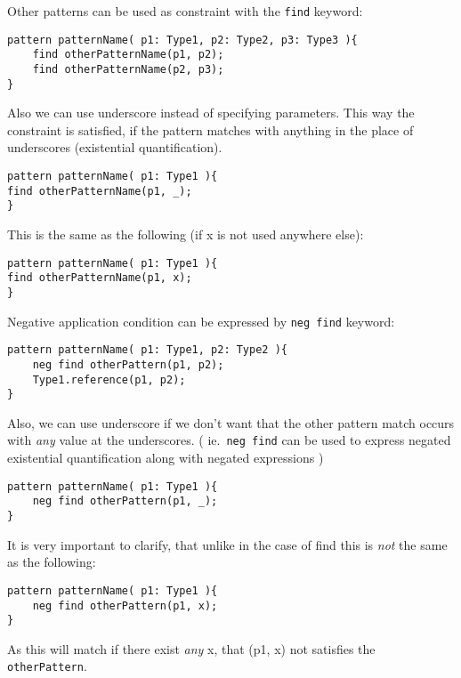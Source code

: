 \begin{minipage}{\textwidth}
Other patterns can be used as constraint with the \texttt{find} keyword:
\begin{lstlisting}[language=vql]
pattern patternName( p1: Type1, p2: Type2, p3: Type3 ){
	find otherPatternName(p1, p2);
	find otherPatternName(p2, p3);
}
\end{lstlisting}

Also we can use underscore instead of specifying parameters. 
This way the constraint is satisfied, if the pattern matches with anything in the place of underscores (existential quantification).
\begin{lstlisting}[language=vql]
pattern patternName( p1: Type1 ){
find otherPatternName(p1, _);
}
\end{lstlisting}

This is the same as the following (if x is not used anywhere else):
\begin{lstlisting}[language=vql]
pattern patternName( p1: Type1 ){
find otherPatternName(p1, x);
}
\end{lstlisting}
\end{minipage}
\vspace{\belowdisplayskip}

\begin{minipage}{\textwidth}
Negative application condition can be expressed by \texttt{neg find} keyword:
\begin{lstlisting}[language=vql]
pattern patternName( p1: Type1, p2: Type2 ){
	neg find otherPattern(p1, p2);
	Type1.reference(p1, p2);
}
\end{lstlisting}

Also, we can use underscore if we don't want that the other pattern match occurs with \emph{any} value at the underscores. ( ie.\ \texttt{neg find} can be used to express negated existential quantification along with negated expressions )

\begin{lstlisting}[language=vql]
pattern patternName( p1: Type1 ){
	neg find otherPattern(p1, _);
}
\end{lstlisting}

It is very important to clarify, that unlike in the case of find this is \emph{not} the same as the following:

\begin{lstlisting}[language=vql]
pattern patternName( p1: Type1 ){
	neg find otherPattern(p1, x);
}
\end{lstlisting}
As this will match if there exist \emph{any} x, that (p1, x) not satisfies the \texttt{otherPattern}.


\end{minipage}
\vspace{\belowdisplayskip}



